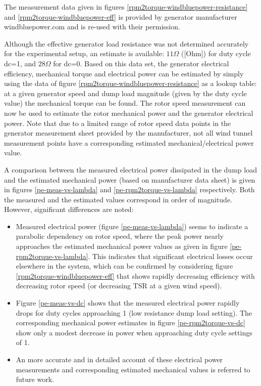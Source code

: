 \documentclass[a4paper]{jpconf}
\begin{document}
The measurement data given in figures \ref{rpm2torque-windbluepower-resistance} and \ref{rpm2torque-windbluepower-eff} is provided by generator manufacturer windbluepower.com and is re-used with their permission.

Although the effective generator load resistance was not determined accurately for the experimental setup, an estimate is available: $11 \Omega$ ([Ohm]) for duty cycle dc=1, and $28 \Omega$ for dc=0. Based on this data set, the generator electrical efficiency, mechanical torque and electrical power can be estimated by simply using the data of figure \ref{rpm2torque-windbluepower-resistance} as a lookup table: at a given generator speed and dump load magnitude (given by the duty cycle value) the mechanical torque can be found. The rotor speed measurement can now be used to estimate the rotor mechanical power and the generator electrical power. Note that due to a limited range of rotor speed data points in the generator measurement sheet provided by the manufacturer, not all wind tunnel measurement points have a corresponding estimated mechanical/electrical power value.

A comparison between the measured electrical power dissipated in the dump load and the estimated mechanical power (based on manufacturer data sheet) is given in figures \ref{pe-meas-vs-lambda} and \ref{pe-rpm2torque-vs-lambda} respectively. Both the measured and the estimated values correspond in order of magnitude. However, significant differences are noted:
\begin{itemize}
	\item Measured electrical power (figure \ref{pe-meas-vs-lambda}) seems to indicate a parabolic dependency on rotor speed, where the peak power nearly approaches the estimated mechanical power values as given in figure \ref{pe-rpm2torque-vs-lambda}. This indicates that significant electrical losses occur elsewhere in the system, which can be confirmed by considering figure \ref{rpm2torque-windbluepower-eff} that shows rapidly decreasing efficiency with decreasing rotor speed (or decreasing TSR at a given wind speed).
	\item Figure \ref{pe-meas-vs-dc} shows that the measured electrical power rapidly drops for duty cycles approaching 1 (low resistance dump load setting). The corresponding mechanical power estimates in figure \ref{pe-rpm2torque-vs-dc} show only a modest decrease in power when approaching duty cycle settings of 1.
	\item An more accurate and in detailed account of these electrical power measurements and corresponding estimated mechanical values is referred to future work.
\end{itemize}
\end{document}
